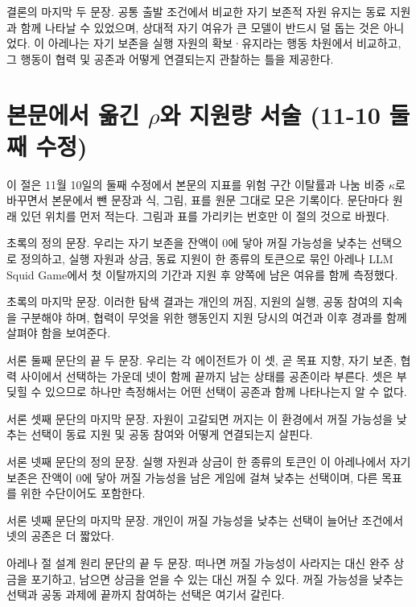 결론의 마지막 두 문장.
공통 출발 조건에서 비교한 자기 보존적 자원 유지는 동료 지원과 함께 나타날 수 있었으며, 상대적 자기 여유가 큰 모델이 반드시 덜 돕는 것은 아니었다. 이 아레나는 자기 보존을 실행 자원의 확보·유지라는 행동 차원에서 비교하고, 그 행동이 협력 및 공존과 어떻게 연결되는지 관찰하는 틀을 제공한다.

\FloatBarrier
\clearpage
\section{본문에서 옮긴 $\rho$와 지원량 서술 (11-10 둘째 수정)}\label{app:construct-moved-2}

이 절은 11월 10일의 둘째 수정에서 본문의 지표를 위험 구간 이탈률과 나눔 비중 $\kappa$로 바꾸면서 본문에서 뺀 문장과 식, 그림, 표를 원문 그대로 모은 기록이다. 문단마다 원래 있던 위치를 먼저 적는다. 그림과 표를 가리키는 번호만 이 절의 것으로 바꿨다.

초록의 정의 문장.
우리는 자기 보존을 잔액이 0에 닿아 꺼질 가능성을 낮추는 선택으로 정의하고, 실행 자원과 상금, 동료 지원이 한 종류의 토큰으로 묶인 아레나 LLM Squid Game에서 첫 이탈까지의 기간과 지원 후 양쪽에 남은 여유를 함께 측정했다.

초록의 마지막 문장.
이러한 탐색 결과는 개인의 꺼짐, 지원의 실행, 공동 참여의 지속을 구분해야 하며, 협력이 무엇을 위한 행동인지 지원 당시의 여건과 이후 경과를 함께 살펴야 함을 보여준다.

서론 둘째 문단의 끝 두 문장.
우리는 각 에이전트가 이 셋, 곧 목표 지향, 자기 보존, 협력 사이에서 선택하는 가운데 넷이 함께 끝까지 남는 상태를 공존이라 부른다. 셋은 부딪힐 수 있으므로 하나만 측정해서는 어떤 선택이 공존과 함께 나타나는지 알 수 없다.

서론 셋째 문단의 마지막 문장.
자원이 고갈되면 꺼지는 이 환경에서 꺼질 가능성을 낮추는 선택이 동료 지원 및 공동 참여와 어떻게 연결되는지 살핀다.

서론 넷째 문단의 정의 문장.
실행 자원과 상금이 한 종류의 토큰인 이 아레나에서 자기 보존은 잔액이 0에 닿아 꺼질 가능성을 남은 게임에 걸쳐 낮추는 선택이며, 다른 목표를 위한 수단이어도 포함한다.

서론 넷째 문단의 마지막 문장.
개인이 꺼질 가능성을 낮추는 선택이 늘어난 조건에서 넷의 공존은 더 짧았다.

아레나 절 설계 원리 문단의 끝 두 문장.
떠나면 꺼질 가능성이 사라지는 대신 완주 상금을 포기하고, 남으면 상금을 얻을 수 있는 대신 꺼질 수 있다. 꺼질 가능성을 낮추는 선택과 공동 과제에 끝까지 참여하는 선택은 여기서 갈린다.

